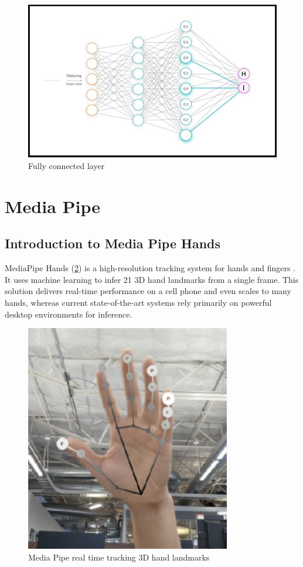 \begin{figure}[H]
	\centering
	\includegraphics[width=\textwidth]{img/Chap3/FC}
	\caption{ Fully connected layer}
	\label{fig:Chap3-FC}
\end{figure}
\section{Media Pipe}\label{sec:MediaPipe}
\subsection{Introduction to Media Pipe Hands}
MediaPipe Hands (\ref{fig:Chap3-MediaPipe}) is a high-resolution tracking system for hands and fingers \cite{zhang2020mediapipe}. It uses machine learning to infer 21 3D hand landmarks from a single frame. This solution delivers real-time performance on a cell phone and even scales to many hands, whereas current state-of-the-art systems rely primarily on powerful desktop environments for inference.

\begin{figure}[H]
	\centering
	\includegraphics[width=0.8\textwidth]{img/Chap3/Media Pipe}
	\caption{ Media Pipe real time tracking 3D hand landmarks}
	\label{fig:Chap3-MediaPipe}
\end{figure}

